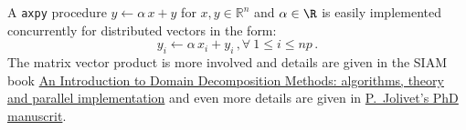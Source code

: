 A {\tt axpy} procedure $y \leftarrow \alpha\,x+y$ for $x,y\in \mathbb{R}^{n}$ and $\alpha\in\R$ is easily implemented concurrently for distributed vectors in the form:
\[
y_i \leftarrow \alpha\,x_i+y_i\,, \forall\ 1\le i \le np\,.
\]
The matrix vector product is more involved and details are given in the SIAM book  \href{https://www.ljll.math.upmc.fr/nataf/OT144DoleanJolivetNataf_full.pdf}{An Introduction to Domain Decomposition Methods: algorithms, theory and parallel implementation} \cite{Dolean:2015:IDD} and even more details are given in \href{http://jolivet.perso.enseeiht.fr/thesis.pdf}{P.~Jolivet's PhD manuscrit}.





